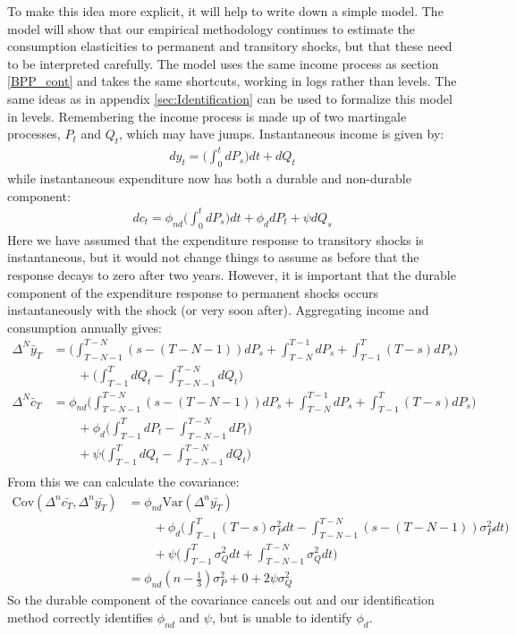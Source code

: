 To make this idea more explicit, it will help to write down a simple model. The model will show that our empirical methodology continues to estimate the consumption elasticities to permanent and transitory shocks, but that these need to be interpreted carefully. The model uses the same income process as section \ref{BPP_cont} and takes the same shortcuts, working in logs rather than levels. The same ideas as in appendix \ref{sec:Identification} can be used to formalize this model in levels. Remembering the income process is made up of two martingale processes, $P_t$ and $Q_t$, which may have jumps. Instantaneous income is given by:
\begin{align*}
dy_t = \Big( \int_{0}^{t}dP_s \Big) dt  +dQ_t 
\end{align*}
while instantaneous expenditure now has both a durable and non-durable component:
\begin{align*}
dc_t = \phi_{nd} \Big( \int_{0}^{t} dP_s  \Big) dt + \phi_{d} dP_t + \psi dQ_s
\end{align*}
Here we have assumed that the expenditure response to transitory shocks is instantaneous, but it would not change things to assume as before that the response decays to zero after two years. However, it is important that the durable component of the expenditure response to permanent shocks occurs instantaneously with the shock (or very soon after). Aggregating income and consumption annually gives:
\begin{align*}
\Delta^N \bar{y}_T &=  \Big(\int_{T-N-1}^{T-N} (s-(T-N-1))dP_s  + \int_{T-N}^{T-1}dP_s + \int_{T-1}^{T} (T-s)dP_s \Big) \\
& \qquad + \Big(\int_{T-1}^{T} dQ_t -\int_{T-N-1}^{T-N} dQ_t \Big) \\
\Delta^N \bar{c}_T &= \phi_{nd} \Big(\int_{T-N-1}^{T-N} (s-(T-N-1))dP_s  + \int_{T-N}^{T-1}dP_s + \int_{T-1}^{T} (T-s)dP_s \Big) \\
& \qquad + \phi_d \Big(\int_{T-1}^{T} dP_t -\int_{T-N-1}^{T-N} dP_t \Big) \\
& \qquad + \psi \Big(\int_{T-1}^{T} dQ_t -\int_{T-N-1}^{T-N} dQ_t \Big) \\
\end{align*}
From this we can calculate the covariance:
\begin{align*}
\mathrm{Cov}(\Delta^n \bar{c_T},\Delta^n \bar{y_T} ) &= \phi_{nd} \mathrm{Var}(\Delta^n \bar{y_T}) \\
& \qquad + \phi_d \Bigg( \int_{T-1}^{T} (T-s) \sigma_P^2 dt - \int_{T-N-1}^{T-N}(s-(T-N-1)) \sigma_P^2 dt \Bigg) \\
& \qquad + \psi\Bigg(\int_{T-1}^{T}  \sigma_Q^2 dt + \int_{T-N-1}^{T-N}\sigma_Q^2 dt\Bigg) \\
&= \phi_{nd} (n-\frac{1}{3})\sigma_P^2 + 0 +  2 \psi \sigma_Q^2
\end{align*}
So the durable component of the covariance cancels out and our identification method correctly identifies $\phi_{nd}$ and $\psi$, but is unable to identify $\phi_d$.


